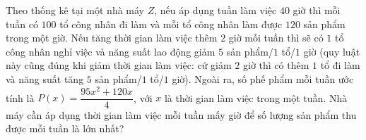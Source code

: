 \begin{ex}
Theo thống kê tại một nhà máy $Z$, nếu áp dụng tuần làm việc $40$ giờ thì mỗi tuần có $100$ tổ công nhân đi làm và mỗi tổ công nhân làm được $120$ sản phẩm trong một giờ. Nếu tăng thời gian làm việc thêm $2$ giờ mỗi tuần thì sẽ có $1$ tổ công nhân nghỉ việc và năng suất lao động giảm $5$ sản phẩm/$1$ tổ/$1$ giờ (quy luật này cũng đúng khi giảm thời gian làm việc: cứ giảm $2$ giờ thì có thêm $1$ tổ đi làm và năng suất tăng $5$ sản phẩm/$1$ tổ/$1$ giờ). Ngoài ra, số phế phẩm mỗi tuần ước tính là $P(x)=\dfrac{95x^2+120x}{4}$, với $x$ là thời gian làm việc trong một tuần. Nhà máy cần áp dụng thời gian làm việc mỗi tuần mấy giờ để số lượng sản phẩm thu được mỗi tuần là lớn nhất?
\end{ex}
